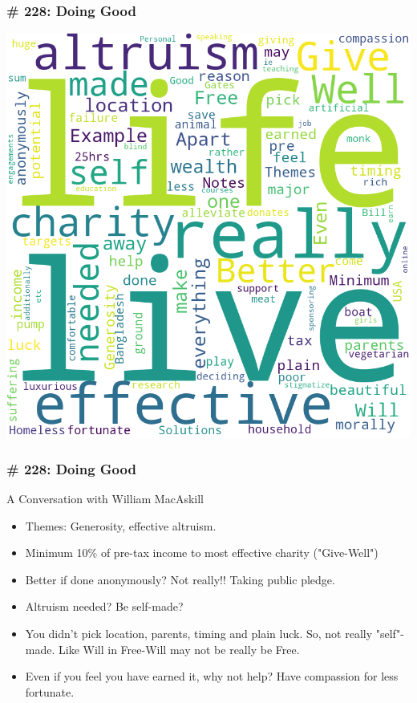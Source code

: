 \begin{frame}[fragile]
\frametitle{\# 228: Doing Good}


 \begin{center}

\includegraphics[width=0.6\linewidth,keepaspectratio]{images/Review_Podcast_MakingSene_228_DoingGood}
\end{center}

\end{frame}

\begin{frame}[fragile]
\frametitle{\# 228: Doing Good}

 A Conversation with William MacAskill

\begin{itemize}
\item Themes: Generosity, effective altruism.
\item Minimum 10\% of pre-tax income to most effective charity ("Give-Well")
\item  Better if done anonymously? Not really!! Taking public pledge.
\item  Altruism needed? Be self-made?
\item  You didn't pick location, parents, timing and plain luck. So, not really "self"-made. Like Will in Free-Will may not be really be Free.
\item  Even if you feel you have earned it, why not help? Have compassion for less fortunate.
	\end{itemize}

\end{frame}

